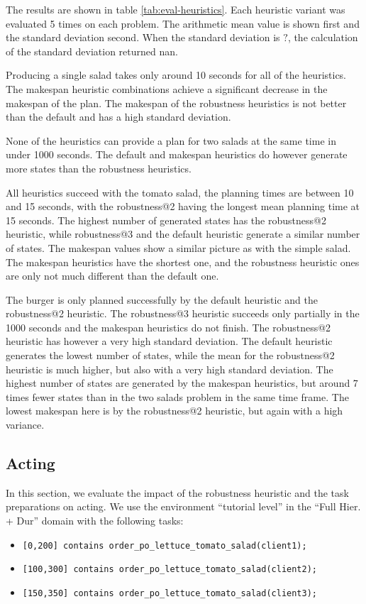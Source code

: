 The results are shown in table \ref{tab:eval-heuristics}.
Each heuristic variant was evaluated 5 times on each problem.
The arithmetic mean value is shown first and the standard deviation second.
When the standard deviation is $?$, the calculation of the standard deviation returned nan.

Producing a single salad takes only around 10 seconds for all of the heuristics.
The makespan heuristic combinations achieve a significant decrease in the makespan of the plan.
The makespan of the robustness heuristics is not better than the default and has a high standard deviation.

None of the heuristics can provide a plan for two salads at the same time in under 1000 seconds.
The default and makespan heuristics do however generate more states than the robustness heuristics.

All heuristics succeed with the tomato salad, the planning times are between 10 and 15 seconds, with the robustness@2 having the longest mean planning time at 15 seconds.
The highest number of generated states has the robustness@2 heuristic, while robustness@3 and the default heuristic generate a similar number of states.
The makespan values show a similar picture as with the simple salad.
The makespan heuristics have the shortest one, and the robustness heuristic ones are only not much different than the default one.

The burger is only planned successfully by the default heuristic and the robustness@2 heuristic.
The robustness@3 heuristic succeeds only partially  in the 1000 seconds and the makespan heuristics do not finish.
The robustness@2 heuristic has however a very high standard deviation.
The default heuristic generates the lowest number of states, while the mean for the robustness@2 heuristic is much higher, but also with a very high standard deviation.
The highest number of states are generated by the makespan heuristics, but around 7 times fewer states than in the two salads problem in the same time frame.
The lowest makespan here is by the robustness@2 heuristic, but again with a high variance.

\subsection{Acting}

In this section, we evaluate the impact of the robustness heuristic and the task preparations on acting.
We use the environment ``tutorial level'' in the ``Full Hier. + Dur'' domain with the following tasks:
\begin{itemize}
  \item \verb|[0,200] contains order_po_lettuce_tomato_salad(client1);|
  \item \verb|[100,300] contains order_po_lettuce_tomato_salad(client2);|
  \item \verb|[150,350] contains order_po_lettuce_tomato_salad(client3);|
\end{itemize}


